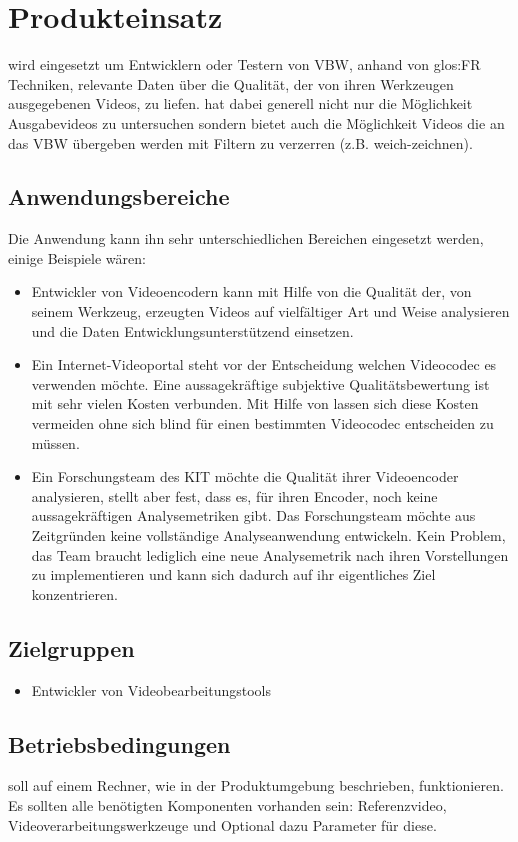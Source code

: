 \chapter{Produkteinsatz}
\projektTitel wird eingesetzt um Entwicklern oder Testern von \gls{VBW}, anhand von \gls{glos:FR} Techniken,
relevante Daten über die Qualität, der von ihren Werkzeugen ausgegebenen Videos, zu liefen.\newline
\projektTitel hat dabei generell nicht nur die Möglichkeit Ausgabevideos zu untersuchen sondern bietet auch die Möglichkeit
Videos die an das \gls{VBW} übergeben werden mit Filtern zu verzerren (z.B. weich-zeichnen).
\section{Anwendungsbereiche}
Die Anwendung kann ihn sehr unterschiedlichen Bereichen eingesetzt werden, einige Beispiele wären:
\begin{itemize}
\item Entwickler von Videoencodern kann mit Hilfe von \projektTitel die Qualität der, von seinem
		Werkzeug, erzeugten Videos auf vielfältiger Art und Weise analysieren und die Daten
		Entwicklungsunterstützend einsetzen.
\item Ein Internet-Videoportal steht vor der Entscheidung welchen Videocodec es verwenden möchte.
		Eine aussagekräftige subjektive Qualitätsbewertung ist mit sehr vielen Kosten verbunden.
		Mit Hilfe von \projektTitel lassen sich diese Kosten vermeiden ohne sich blind für
		einen bestimmten Videocodec entscheiden zu müssen.
\item Ein Forschungsteam des \gls{KIT} möchte die Qualität ihrer Videoencoder analysieren, stellt
		aber fest, dass es, für ihren Encoder, noch keine aussagekräftigen Analysemetriken gibt.
		Das Forschungsteam möchte aus Zeitgründen keine vollständige Analyseanwendung entwickeln.
		Kein Problem, das Team braucht lediglich \projektTitel eine neue Analysemetrik nach ihren
		Vorstellungen zu implementieren und kann sich dadurch auf ihr eigentliches Ziel konzentrieren. 
\end{itemize}
\section{Zielgruppen}
\begin{itemize}

\item Entwickler von Videobearbeitungstools

\end{itemize}
\section{Betriebsbedingungen}
\projektTitel soll auf einem Rechner, wie in der Produktumgebung beschrieben, funktionieren.
Es sollten alle benötigten Komponenten vorhanden sein:
Referenzvideo, Videoverarbeitungswerkzeuge und Optional dazu Parameter für diese.